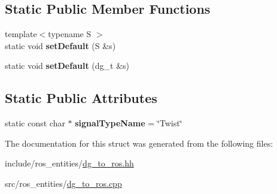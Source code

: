 \subsection*{Static Public Member Functions}
\begin{DoxyCompactItemize}
\item 
\mbox{\label{structdynamic__graph_1_1DgToRos_3_01specific_1_1Twist_01_4_a103fc59c5fe83026969506d6720d24cd}} 
{\footnotesize template$<$typename S $>$ }\\static void {\bfseries set\+Default} (S \&s)
\item 
\mbox{\label{structdynamic__graph_1_1DgToRos_3_01specific_1_1Twist_01_4_a80fcec4f775fd6426af80fa7f819fa9a}} 
static void {\bfseries set\+Default} (dg\+\_\+t \&s)
\end{DoxyCompactItemize}
\subsection*{Static Public Attributes}
\begin{DoxyCompactItemize}
\item 
\mbox{\label{structdynamic__graph_1_1DgToRos_3_01specific_1_1Twist_01_4_a54d45a12202156921071c9b7d3c83a62}} 
static const char $\ast$ {\bfseries signal\+Type\+Name} = \char`\"{}Twist\char`\"{}
\end{DoxyCompactItemize}


The documentation for this struct was generated from the following files\+:\begin{DoxyCompactItemize}
\item 
include/ros\+\_\+entities/\hyperlink{dg__to__ros_8hh}{dg\+\_\+to\+\_\+ros.\+hh}\item 
src/ros\+\_\+entities/\hyperlink{dg__to__ros_8cpp}{dg\+\_\+to\+\_\+ros.\+cpp}\end{DoxyCompactItemize}
